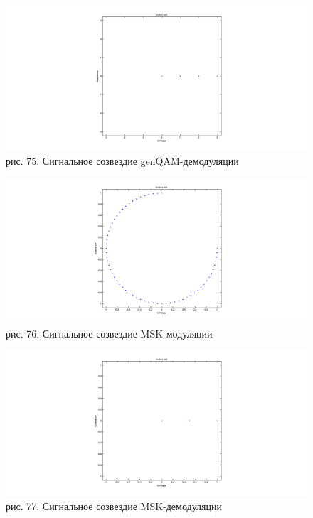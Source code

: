 \documentclass[10pt,a4paper]{report}
\begin{document}
\begin{figure}
\begin{center}
\includegraphics[width=150mm, scale = 0.9]{91_8}\newline
рис. 75. Сигнальное созвездие genQAM-демодуляции\newline
\end{center}
\end{figure}
\begin{figure}
\begin{center}
\includegraphics[width=150mm, scale = 0.9]{91_9}\newline
рис. 76. Сигнальное созвездие MSK-модуляции\newline
\end{center}
\end{figure}
\begin{figure}
\begin{center}
\includegraphics[width=150mm, scale = 0.9]{91_10}\newline
рис. 77. Сигнальное созвездие MSK-демодуляции\newline
\end{center}
\end{figure}
\end{document}
